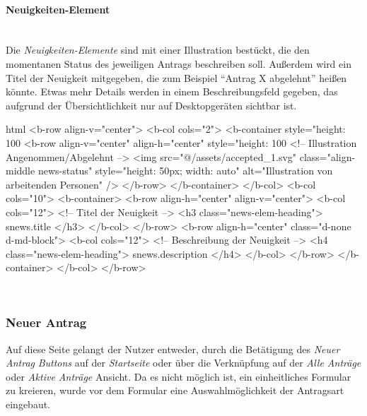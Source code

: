 \paragraph{Neuigkeiten-Element}
~\\
Die \textit{Neuigkeiten-Elemente} sind mit einer Illustration bestückt, die den momentanen Status des jeweiligen Antrags beschreiben soll. Außerdem wird ein Titel der Neuigkeit mitgegeben, die zum Beispiel \enquote{Antrag X abgelehnt} heißen könnte. Etwas mehr Details werden in einem Beschreibungsfeld gegeben, das aufgrund der Übersichtlichkeit nur auf Desktopgeräten sichtbar ist.
\begin{code}{html}
	<b-row align-v="center">
	<b-col cols="2">
	  <b-container style="height: 100%
		<b-row align-v="center" align-h="center" style="height: 100%
		  <!-- Illustration Angenommen/Abgelehnt -->
		  <img
			src="@/assets/accepted_1.svg"
			class="align-middle news-status"
			style="height: 50px; width: auto"
			alt="Illustration von arbeitenden Personen"
		  />
		</b-row>
	  </b-container>
	</b-col>
	<b-col cols="10">
	  <b-container>
		<b-row align-h="center" align-v="center">
		  <b-col cols="12">
			<!-- Titel der Neuigkeit -->
			<h3 class="news-elem-heading">{{ snews.title }}</h3>
		  </b-col>
		</b-row>
		<b-row align-h="center" class="d-none d-md-block">
		  <b-col cols="12">
			<!-- Beschreibung der Neuigkeit -->
			<h4 class="news-elem-heading">{{ snews.description }}</h4>
		  </b-col>
		</b-row>
	  </b-container>
	</b-col>
  </b-row>	
\end{code}
	\label{list:htmlnews} ~\\
\newpage
\subsubsection{Neuer Antrag}
\label{chapter:implementierung-frontend-komponenten-neu}
Auf diese Seite gelangt der Nutzer entweder, durch die Betätigung des \textit{Neuer Antrag} \textit{Buttons} auf der \textit{Startseite} oder über die Verknüpfung auf der \textit{Alle Anträge} oder \textit{Aktive Anträge} Ansicht. Da es nicht möglich ist, ein einheitliches Formular zu kreieren, wurde vor dem Formular eine Auswahlmöglichkeit der Antragsart eingebaut.
